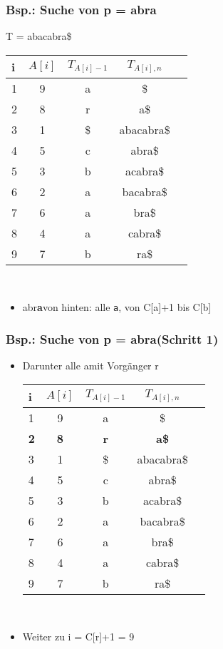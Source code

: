 \documentclass{beamer}
\begin{document}
\begin{frame}
\frametitle{Bsp.: Suche von p = \glqq abra\grqq }
T = \glqq abacabra\$\grqq\\[5mm]
\begin{tabular}{l<{\ttfamily}|c<{\ttfamily} c<{\ttfamily}c<{\ttfamily} l<{\ttfamily}}
\textbf{i} & $A[i]$ & $T_{A[i]-1}$ & $T_{A[i],n}$\\\hline
1 & 9 & a & \$ \\
2 & 8 & r & a\$ \\
3 & 1 & \$ & abacabra\$ \\
4 & 5 & c & abra\$ \\
5 & 3 & b & acabra\$ \\
6 & 2 & a & bacabra\$ \\
7 & 6 & a & bra\$ \\
8 & 4 & a & cabra\$ \\
9 & 7 & b & ra\$ \\
\end{tabular}\\[5mm]
\begin{itemize}
\item \glqq abr{\color{red}\textbf{a}}\grqq von hinten: alle \texttt{a}, von C[\glqq a\grqq ]+1 bis C[\glqq b\grqq ]
\end{itemize}
\end{frame}
\begin{frame}
\frametitle{Bsp.: Suche von p = \glqq abra\grqq (Schritt 1)}
\begin{itemize}
\item Darunter alle \glqq a\grqq mit Vorgänger \glqq r\grqq\\[5mm]
\begin{tabular}{l<{\ttfamily}|c<{\ttfamily} c<{\ttfamily}c<{\ttfamily} l<{\ttfamily}}
\textbf{i} & $A[i]$ & $T_{A[i]-1}$ & $T_{A[i],n}$\\\hline
1 & 9 & a & \$ \\
\textbf{2} & \textbf{8} & \color{red}\textbf{r} & \textbf{a\$} \\
3 & 1 & \$ & abacabra\$ \\
4 & 5 & c & abra\$ \\
5 & 3 & b & acabra\$ \\
6 & 2 & a & bacabra\$ \\
7 & 6 & a & bra\$ \\
8 & 4 & a & cabra\$ \\
9 & 7 & b & ra\$ \\
\end{tabular}\\[5mm]
\item Weiter zu i = C[\glqq r\grqq]+1 = 9
\end{itemize}
\end{frame}
\end{document}
